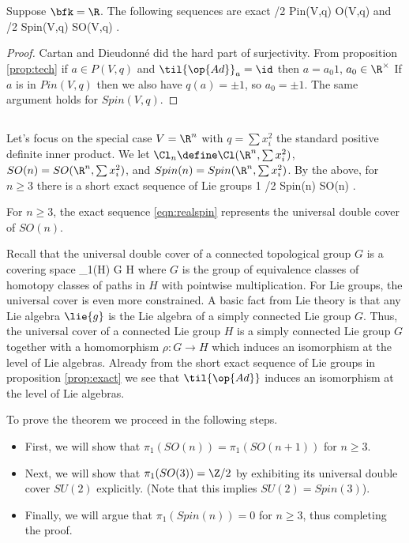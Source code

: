 \documentclass[../main.tex]{subfiles}
\begin{document}
\begin{prop}\label{prop:exact}
Suppose $\bfk=\R$.
The following sequences are exact 
 \to \Z/2 \to Pin(V,q) \to O(V,q)  
\eeqn
and
 \to \Z/2 \to Spin(V,q) \to SO(V,q)  .
\eeqn
\end{prop}
\begin{proof}
Cartan and Dieudonn\'e did the hard part of surjectivity.
From proposition \ref{prop:tech} if $a \in P(V,q)$ and $\til {\op{Ad}}_a = \id$ then $a = a_0 1$, $a_0 \in \R^\times$
If $a$ is in $Pin(V,q)$ then we also have $q(a) = \pm 1$, so $a_0 = \pm 1$.
The same argument holds for $Spin(V,q)$.
\end{proof}

\subsection{}

Let's focus on the special case $V = \R^n$ with $q = \sum x_i^2$ the standard positive definite inner product. 
We let $\Cl_n \define \Cl(\R^n, \sum x_i^2)$, $SO(n) = SO(\R^n,\sum x_i^2)$, and $Spin(n) = Spin(\R^n, \sum x_i^2)$.
By the above, for $n \geq 3$ there is a short exact sequence of Lie groups
\beqn\label{eqn:realspin}
1 \to \Z/2 \to Spin(n) \to SO(n)  .
\eeqn

\begin{thm}
For $n \geq 3$, the exact sequence \eqref{eqn:realspin} represents the universal double cover of $SO(n)$.
\end{thm}

Recall that the universal double cover of a connected topological group $G$ is a covering space
 \to \pi_1(H) \to G \to H 
\eeqn
where $G$ is the group of equivalence classes of homotopy classes of paths in $H$ with pointwise multiplication.
For Lie groups, the universal cover is even more constrained.
A basic fact from Lie theory is that any Lie algebra $\lie{g}$ is the Lie algebra of a simply connected Lie group $G$.
Thus, the universal cover of a connected Lie group $H$ is a simply connected Lie group $G$ together with a homomorphism $\rho \colon G \to H$ which induces an isomorphism at the level of Lie algebras.
Already from the short exact sequence of Lie groups in proposition \ref{prop:exact} we see that $\til{\op{Ad}}$ induces an isomorphism at the level of Lie algebras.

To prove the theorem we proceed in the following steps.
\begin{itemize}
  \item First, we will show that $\pi_{1}(SO(n))=\pi_{1}(SO(n+1))$ for $n
        \geq 3$.
  \item Next, we will show that $\pi_{1}(SO(3))=\Z/2$ by exhibiting its universal double cover $SU(2)$ explicitly. (Note that this implies $SU(2) = Spin(3)$).
  \item Finally, we will argue that $\pi_{1}(Spin(n))=0$ for $n\geq 3$, thus completing the proof.
\end{itemize}
\end{document}
